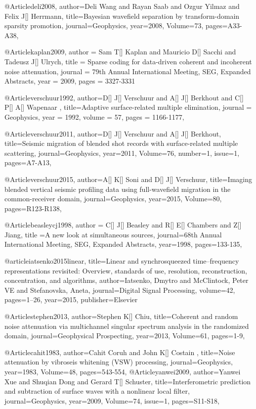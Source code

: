 @Article{deli2008,
  author={Deli Wang and Rayan Saab and Ozgur Yilmaz and Felix J[] Herrmann},
  title={Bayesian wavefield separation by transform-domain sparsity promotion},
  journal={Geophysics},
  year=2008,
  Volume=73,
  pages={A33-A38},
}


@Article{kaplan2009,
  author = 	 {Sam T[] Kaplan and Mauricio D[] Sacchi and Tadeusz J[] Ulrych},
  title = 	 {Sparse coding for data-driven coherent and incoherent noise attenuation},
  journal = 	 {79th Annual International Meeting, SEG, Expanded Abstracts},
  year = 	 2009,
  pages =	 {3327-3331}
}



@Article{verschuur1992,
  author={D[] J[] Verschuur and A[] J[] Berkhout and C[] P[] A[] Wapenaar },
  title={Adaptive surface-related multiple elimination},
  journal = 	 {Geophysics},
  year = 	 1992,
  volume =	 57,
  pages =	 {1166-1177},
}

@Article{verschuur2011,
  author={D[] J[] Verschuur and A[] J[] Berkhout},
  title={Seismic migration of blended shot records with surface-related multiple scattering},
  journal={Geophysics},
  year=2011,
  Volume=76,
  number=1,
  issue=1,
  pages={A7-A13},
}

@Article{verschuur2015,
  author={A[] K[] Soni and D[] J[] Verschuur},
  title={Imaging blended vertical seismic profiling data using full-wavefield migration in the common-receiver domain},
  journal={Geophysics},
  year=2015,
  Volume=80,
  pages={R123-R138},
}


@Article{beasleycj1998,
  author = {C[] J[] Beasley and R[] E[] Chambers and Z[] Jiang},
  title ={A new look at simultaneous sources},
  journal={68th Annual International Meeting, SEG, Expanded Abstracts},
  year=1998,
  pages={133-135},
}

@article{iatsenko2015linear,
  title={Linear and synchrosqueezed time--frequency representations revisited: Overview, standards of use, resolution, reconstruction, concentration, and algorithms},
  author={Iatsenko, Dmytro and McClintock, Peter VE and Stefanovska, Aneta},
  journal={Digital Signal Processing},
  volume={42},
  pages={1--26},
  year={2015},
  publisher={Elsevier}
}


@Article{stephen2013,
  author={Stephen K[] Chiu},
  title={Coherent and random noise attenuation via multichannel singular spectrum analysis in the randomized domain},
  journal={Geophysical Prospecting},
  year=2013,
  Volume=61,
  pages={1-9},
}


@Article{cahit1983,
  author={Cahit Coruh and John K[] Costain },
  title={Noise attenuation by vibroseis whitening (VSW) processing},
  journal={Geophysics},
  year=1983,
  Volume=48,
  pages={543-554},
}
@Article{yanwei2009,
  author={Yanwei Xue and Shuqian Dong and Gerard T[] Schuster},
  title={Interferometric prediction and subtraction of surface waves with a nonlinear local filter},
  journal={Geophysics},
  year=2009,
  Volume=74,
  issue=1,
  pages={S11-S18},
}






